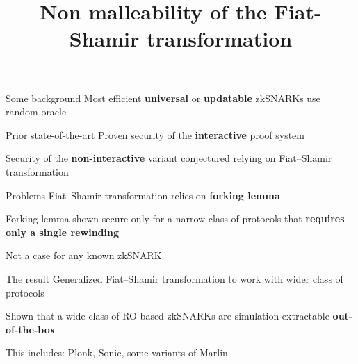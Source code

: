 \documentclass[aspectratio=169]{beamer}
\title{Non malleability of the Fiat-Shamir transformation}
\author{\scriptsize{Michal Zajac \inst{1} \and Markulf Kohlweiss \inst{2}}}
\institute{\inst{1} Clearmatics \inst{2}IOHK}
\date{}
\renewcommand{\emph}[1]{\textbf{#1}}
\begin{document}
\begin{frame}
\titlepage
\end{frame}

\begin{frame}
  \begin{block}{Some background}
    Most efficient \emph{universal} or \emph{updatable} zkSNARKs use random-oracle
  \end{block}\pause  

  \begin{block}{Prior state-of-the-art}
    Proven security of the \emph{interactive} proof system

    Security of the \emph{non-interactive} variant conjectured
      relying on Fiat--Shamir transformation
  \end{block}\pause

  \begin{block}{Problems}
    Fiat--Shamir transformation relies on \emph{forking lemma}

    Forking lemma shown secure only for a narrow class of protocols
    that \emph{requires only a single rewinding}

    Not a case for any known zkSNARK
  \end{block}\pause

  \begin{block}{The result}
    Generalized Fiat--Shamir transformation to work with wider class of protocols
    
     Shown that a wide class of RO-based zkSNARKs are
     simulation-extractable \emph{out-of-the-box}
     
     This includes: Plonk, Sonic, some variants of Marlin
  \end{block}
\end{frame}
\end{document}
